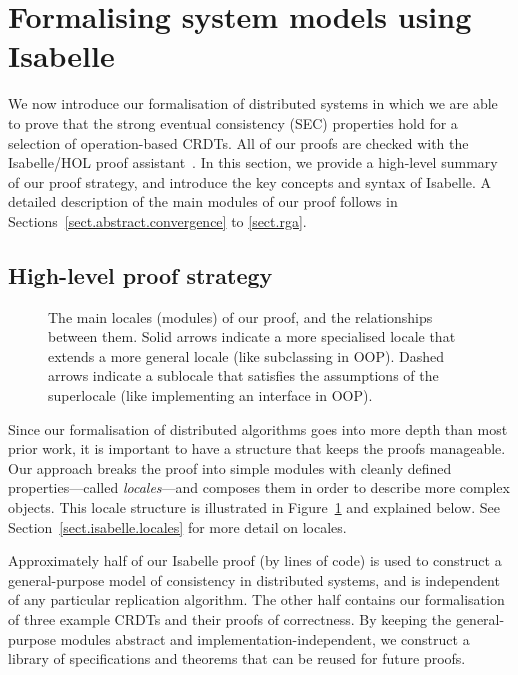 \section{Formalising system models using Isabelle}
\label{sect.isabelle}

We now introduce our formalisation of distributed systems in which we are able to prove that the strong eventual consistency (SEC) properties hold for a selection of operation-based CRDTs.
All of our proofs are checked with the Isabelle/HOL proof assistant~\cite{DBLP:conf/tphol/WenzelPN08}.
In this section, we provide a high-level summary of our proof strategy, and introduce the key concepts and syntax of Isabelle.
A detailed description of the main modules of our proof follows in Sections~\ref{sect.abstract.convergence} to \ref{sect.rga}.

\subsection{High-level proof strategy}
\label{sect.high-level.proof.strategy}

\begin{figure}
\centering

\caption{The main locales (modules) of our proof, and the relationships between them.
Solid arrows indicate a more specialised locale that extends a more general locale (like subclassing in OOP).
Dashed arrows indicate a sublocale that satisfies the assumptions of the superlocale (like implementing an interface in OOP).
}\label{fig.proof.structure}
\end{figure}

Since our formalisation of distributed algorithms goes into more depth than most prior work, it is important to have a structure that keeps the proofs manageable.
Our approach breaks the proof into simple modules with cleanly defined properties---called \emph{locales}---and composes them in order to describe more complex objects.
This locale structure is illustrated in Figure~\ref{fig.proof.structure} and explained below.
See Section~\ref{sect.isabelle.locales} for more detail on locales.

Approximately half of our Isabelle proof (by lines of code) is used to construct a general-purpose model of consistency in distributed systems, and is independent of any particular replication algorithm.
The other half contains our formalisation of three example CRDTs and their proofs of correctness.
By keeping the general-purpose modules abstract and implementation-independent, we construct a library of specifications and theorems that can be reused for future proofs.

